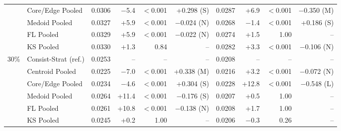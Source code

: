 \begin{table}[t]
\begin{tabular}{llrrrrrrrr}
 & Core/Edge Pooled & 0.0306 & $-$5.4 & $<$0.001 & +0.298 (S) & 0.0287 & +6.9 & $<$0.001 & $-$0.350 (M) \\
 & Medoid Pooled & 0.0327 & +5.9 & $<$0.001 & $-$0.024 (N) & 0.0268 & $-$1.4 & $<$0.001 & +0.186 (S) \\
 & FL Pooled & 0.0329 & +5.9 & $<$0.001 & $-$0.022 (N) & 0.0274 & +1.5 & 1.00 & -- \\
 & KS Pooled & 0.0330 & +1.3 & 0.84 & -- & 0.0282 & +3.3 & $<$0.001 & $-$0.106 (N) \\
\midrule
30\% & Consist-Strat (ref.) & 0.0253 & -- & -- & -- & 0.0208 & -- & -- & -- \\
 & Centroid Pooled & 0.0225 & $-$7.0 & $<$0.001 & +0.338 (M) & 0.0216 & +3.2 & $<$0.001 & $-$0.072 (N) \\
 & Core/Edge Pooled & 0.0234 & $-$4.6 & $<$0.001 & +0.304 (S) & 0.0228 & +12.8 & $<$0.001 & $-$0.548 (L) \\
 & Medoid Pooled & 0.0264 & +11.4 & $<$0.001 & $-$0.176 (S) & 0.0207 & +0.5 & 1.00 & -- \\
 & FL Pooled & 0.0261 & +10.8 & $<$0.001 & $-$0.138 (N) & 0.0208 & +1.7 & 1.00 & -- \\
 & KS Pooled & 0.0245 & +0.2 & 1.00 & -- & 0.0206 & $-$0.3 & 0.26 & -- \\
\bottomrule
\end{tabular}
\end{table}
